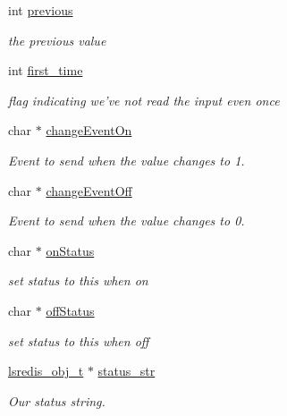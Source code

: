 \begin{DoxyCompactItemize}
int \hyperlink{structlspmac__bi__struct_a00f09cb3d7bdbe1058fb56bb8c2b0fa3}{previous}
\begin{DoxyCompactList}\small\item\em the previous value \end{DoxyCompactList}\item 
int \hyperlink{structlspmac__bi__struct_a814978c33dc99e7911faa4ddb12bfd90}{first\-\_\-time}
\begin{DoxyCompactList}\small\item\em flag indicating we've not read the input even once \end{DoxyCompactList}\item 
char $\ast$ \hyperlink{structlspmac__bi__struct_ae7178007dfdf21be0e5b1fbaa36732af}{change\-Event\-On}
\begin{DoxyCompactList}\small\item\em Event to send when the value changes to 1. \end{DoxyCompactList}\item 
char $\ast$ \hyperlink{structlspmac__bi__struct_ae0859842f637694ace0e6d54c0e2af6a}{change\-Event\-Off}
\begin{DoxyCompactList}\small\item\em Event to send when the value changes to 0. \end{DoxyCompactList}\item 
char $\ast$ \hyperlink{structlspmac__bi__struct_a160aaae81ca309bcac3719a595a19f75}{on\-Status}
\begin{DoxyCompactList}\small\item\em set status to this when on \end{DoxyCompactList}\item 
char $\ast$ \hyperlink{structlspmac__bi__struct_a34564b9372303ed2f1d0758ff5a3fcd8}{off\-Status}
\begin{DoxyCompactList}\small\item\em set status to this when off \end{DoxyCompactList}\item 
\hyperlink{pgpmac_8h_ad449de06d02791adf2498d2a1e1f909c}{lsredis\-\_\-obj\-\_\-t} $\ast$ \hyperlink{structlspmac__bi__struct_af934ce1b86836602a626c3d27627b66e}{status\-\_\-str}
\begin{DoxyCompactList}\small\item\em Our status string. \end{DoxyCompactList}\end{DoxyCompactItemize}


